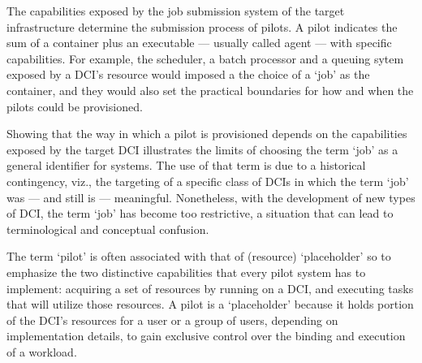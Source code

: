 \documentclass{sig-alternate}
\begin{document}
The capabilities exposed by the job submission system of the target
infrastructure determine the submission process of pilots. A pilot
indicates the sum of a container plus an executable --- usually called
agent --- with  specific capabilities. For example,  the scheduler, a
batch processor and a queuing  sytem exposed by a DCI's resource would
imposed a the choice of a `job' as the \pilot container, and they would
also set the practical boundaries for how and when the pilots could be
provisioned.


Showing that the way in which a pilot is provisioned depends on the
capabilities exposed by the target DCI illustrates the limits of
choosing the term `job' as a general identifier for \pilotjob systems.
The use of that term is due to a historical contingency, viz., the
targeting of a specific class of DCIs in which the term `job' was ---
and still is --- meaningful. Nonetheless, with the development of new
types of DCI, the term `job' has become too restrictive, a situation
that can lead to terminological and conceptual confusion.

The term `pilot' is often associated with that of (resource)
`placeholder' so to emphasize the two distinctive capabilities that
every pilot system has to implement: acquiring a set of resources by
running on a DCI, and executing tasks that will utilize those resources.
A pilot is a `placeholder' because it holds portion of the DCI's
resources for a user or a group of users, depending on implementation
details, to gain exclusive control over the binding and execution of a
workload.
\end{document}
